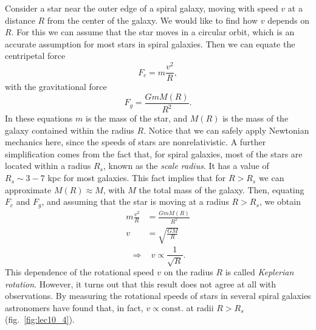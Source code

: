 \documentclass[11pt, a4paper,oneside,openright]{book}
\numberwithin{equation}{section}
\begin{document}
Consider a star near the outer edge of a spiral galaxy, moving with speed $v$ at a distance $R$ from the center of the galaxy. We would like to find how $v$ depends on $R$. For this we can assume that the star moves in a circular orbit, which is an accurate assumption for most stars in spiral galaxies. Then we can equate the centripetal force
\begin{equation}
F_c=m\frac{v^2}{R},
\end{equation}
with the gravitational force
\begin{equation}
F_g=\frac{GmM(R)}{R^2}.
\end{equation}
In these equations $m$ is the mass of the star, and $M(R)$ is the mass of the galaxy contained within the radius $R$. Notice that we can safely apply Newtonian mechanics here, since the speeds of stars are nonrelativistic. A further simplification comes from the fact that, for spiral galaxies, most of the stars are located within a radius $R_s$, known as the {\it scale radius}. It has a value of $R_s\sim 3-7$ kpc for most galaxies. This fact implies that for $R>R_s$ we can approximate $M(R)\approx M$, with $M$ the total mass of the galaxy. Then, equating $F_c$ and $F_g$, and assuming that the star is moving at a radius $R>R_s$, we obtain
\begin{equation}
\begin{split}
m\frac{v^2}{R}&= \frac{GmM(R)}{R^2}\\
v&= \sqrt{\frac{GM}{R}}
\end{split}
\end{equation}
\begin{equation} \label{eq:keplerian_rot}
\Rightarrow~~~~ v\propto \frac{1}{\sqrt{R}}.
\end{equation}
This dependence of the rotational speed $v$ on the radius $R$ is called {\it Keplerian rotation}. However, it turns out that this result does not agree at all with observations. By measuring the rotational speeds of stars in several spiral galaxies astronomers have found that, in fact, $v\propto\mathrm{const.}$ at radii $R>R_s$ (fig.\ \ref{fig:lec10_4}).
\end{document}
